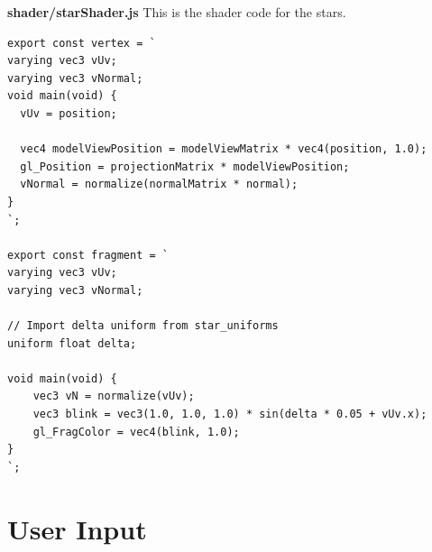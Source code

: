 \textbf{shader/starShader.js}
This is the shader code for the stars.
\begin{lstlisting}
export const vertex = `
varying vec3 vUv;
varying vec3 vNormal;
void main(void) {
  vUv = position;

  vec4 modelViewPosition = modelViewMatrix * vec4(position, 1.0);
  gl_Position = projectionMatrix * modelViewPosition;
  vNormal = normalize(normalMatrix * normal);
}
`;

export const fragment = `
varying vec3 vUv;
varying vec3 vNormal;

// Import delta uniform from star_uniforms
uniform float delta;

void main(void) {
    vec3 vN = normalize(vUv);
    vec3 blink = vec3(1.0, 1.0, 1.0) * sin(delta * 0.05 + vUv.x);
    gl_FragColor = vec4(blink, 1.0);
}
`;
\end{lstlisting}


\section{User Input}
